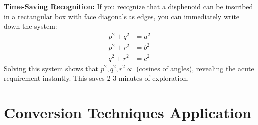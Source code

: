 \documentclass[12pt]{article}
\begin{document}
\begin{protip}
\textbf{Time-Saving Recognition:} If you recognize that a disphenoid can be inscribed in a rectangular box with face diagonals as edges, you can immediately write down the system:
\begin{align*}
p^2 + q^2 &= a^2 \\
p^2 + r^2 &= b^2 \\
q^2 + r^2 &= c^2
\end{align*}
Solving this system shows that $p^2, q^2, r^2 \propto$ (cosines of angles), revealing the acute requirement instantly. This saves 2-3 minutes of exploration.
\end{protip}

\section{Conversion Techniques Application}
\end{document}
